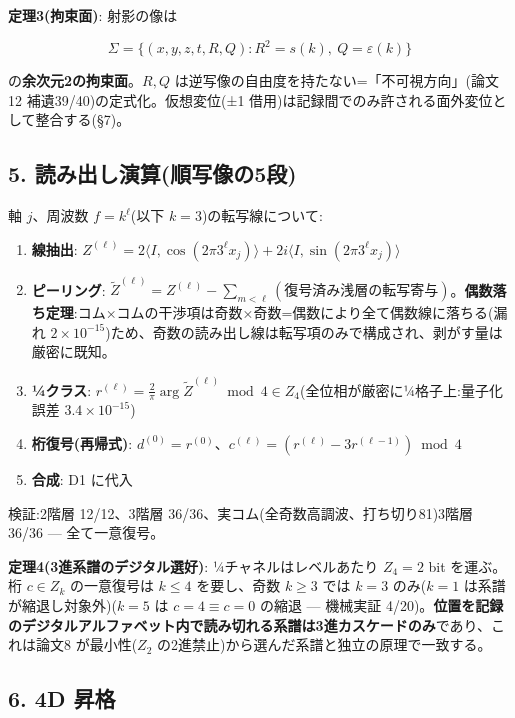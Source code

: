 \documentclass[
]{ltjsarticle}
\providecommand{\tightlist}{%
  \setlength{\itemsep}{0pt}\setlength{\parskip}{0pt}}
\begin{document}
\textbf{定理3(拘束面)}: 射影の像は

\[
\Sigma=\bigl\{(x,y,z,t,R,Q): R^2=s(k),\ Q=\varepsilon(k)\bigr\}
\]

の\textbf{余次元2の拘束面}。\(R,Q\)
は逆写像の自由度を持たない=「不可視方向」(論文12
補遺39/40)の定式化。仮想変位(±1
借用)は記録間でのみ許される面外変位として整合する(§7)。

\subsection{5.
読み出し演算(順写像の5段)}\label{ux8aadux307fux51faux3057ux6f14ux7b97ux9806ux5199ux50cfux306e5ux6bb5}

軸 \(j\)、周波数 \(f=k^\ell\)(以下 \(k=3\))の転写線について:

\begin{enumerate}
\def\labelenumi{\arabic{enumi}.}
\tightlist
\item
  \textbf{線抽出}:
  \(Z^{(\ell)}=2\langle I,\cos(2\pi 3^\ell x_j)\rangle+2i\langle I,\sin(2\pi 3^\ell x_j)\rangle\)
\item
  \textbf{ピーリング}:
  \(\tilde Z^{(\ell)}=Z^{(\ell)}-\sum_{m<\ell}(\text{復号済み浅層の転写寄与})\)。\textbf{偶数落ち定理}:コム×コムの干渉項は奇数×奇数=偶数により全て偶数線に落ちる(漏れ
  \(2\times10^{-15}\))ため、奇数の読み出し線は転写項のみで構成され、剥がす量は厳密に既知。
\item
  \textbf{¼クラス}:
  \(r^{(\ell)}=\frac{2}{\pi}\arg\tilde Z^{(\ell)}\bmod 4\in Z_4\)(全位相が厳密に¼格子上:量子化誤差
  \(3.4\times10^{-15}\))
\item
  \textbf{桁復号(再帰式)}:
  \(d^{(0)}=r^{(0)}\)、\(c^{(\ell)}=(r^{(\ell)}-3r^{(\ell-1)})\bmod4\)
\item
  \textbf{合成}: D1 に代入
\end{enumerate}

検証:2階層 12/12、3階層 36/36、実コム(全奇数高調波、打ち切り81)3階層
36/36 --- 全て一意復号。

\textbf{定理4(3進系譜のデジタル選好)}: ¼チャネルはレベルあたり \(Z_4=2\)
bit を運ぶ。桁 \(c\in Z_k\) の一意復号は \(k\le4\) を要し、奇数
\(k\ge3\) では \(k=3\) のみ(\(k{=}1\) は系譜が縮退し対象外)(\(k{=}5\) は
\(c{=}4\equiv c{=}0\) の縮退 --- 機械実証
4/20)。\textbf{位置を記録のデジタルアルファベット内で読み切れる系譜は3進カスケードのみ}であり、これは論文8
が最小性(\(Z_2\) の2進禁止)から選んだ系譜と独立の原理で一致する。

\subsection{6. 4D 昇格}\label{d-ux6607ux683c}
\end{document}
